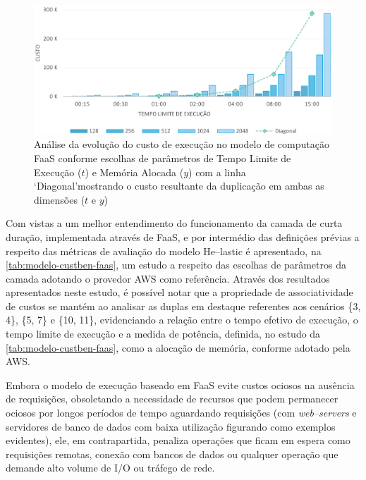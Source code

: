 \documentclass[english,brazilian]{UNISINOSmonografia} %
\begin{document}
\begin{figure}[tb]
	\centering%
	\begin{minipage}{\textwidth}
		\caption[Análise da evolução do custo de execução no modelo de computação FaaS conforme escolhas de parâmetros de Tempo Limite de Execução ($t$) e Memória Alocada ($y$)]{Análise da evolução do custo de execução no modelo de computação FaaS conforme escolhas de parâmetros de Tempo Limite de Execução ($t$) e Memória Alocada ($y$) com a linha \textquoteleft Diagonal\textquoteright mostrando o custo resultante da duplicação em ambas as dimensões ($ t $ e $ y $)}
		\label{fig:modelo-custben-faas}
		\vspace{1ex}
		\includegraphics[width=\textwidth]{modelo-custben-faas}
	\end{minipage}
\end{figure}


Com vistas a um melhor entendimento do funcionamento da camada de curta duração, implementada através de FaaS, e por intermédio das definições prévias a respeito das métricas de avaliação do modelo \textsf{He}--lastic é apresentado, na \autoref{tab:modelo-custben-faas}, um estudo a respeito das escolhas de parâmetros da camada adotando o provedor AWS como referência.
Através dos resultados apresentados neste estudo, é possível notar que a propriedade de associatividade de custos se mantém ao analisar as duplas em destaque referentes aos cenários \{3, 4\}, \{5, 7\} e \{10, 11\}, evidenciando a relação entre o tempo efetivo de execução, o tempo limite de execução e a medida de potência, definida, no estudo da \autoref{tab:modelo-custben-faas}, como a alocação de memória, conforme adotado pela AWS.


Embora o modelo de execução baseado em FaaS evite custos ociosos na ausência de requisições, obsoletando a necessidade de recursos que podem permanecer ociosos por longos períodos de tempo aguardando requisições (com \textit{web--servers} e servidores de banco de dados com baixa utilização figurando como exemplos evidentes), ele, em contrapartida, penaliza operações que ficam em espera como requisições remotas, conexão com bancos de dados ou qualquer operação que demande alto volume de I/O ou tráfego de rede.
\end{document}
